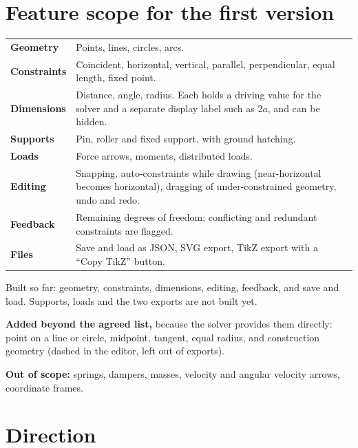 \documentclass[10pt,a4paper]{article}
\begin{document}
\section{Feature scope for the first version}

\begin{tabularx}{\textwidth}{@{}>{\bfseries}p{28mm}L@{}}
\toprule
Geometry & Points, lines, circles, arcs. \\
Constraints & Coincident, horizontal, vertical, parallel, perpendicular, equal length, fixed point. \\
Dimensions & Distance, angle, radius. Each holds a driving value for the solver and a separate display label such as $2a$, and can be hidden. \\
Supports & Pin, roller and fixed support, with ground hatching. \\
Loads & Force arrows, moments, distributed loads. \\
Editing & Snapping, auto-constraints while drawing (near-horizontal becomes horizontal), dragging of under-constrained geometry, undo and redo. \\
Feedback & Remaining degrees of freedom; conflicting and redundant constraints are flagged. \\
Files & Save and load as JSON, SVG export, TikZ export with a ``Copy TikZ'' button. \\
\bottomrule
\end{tabularx}

Built so far: geometry, constraints, dimensions, editing, feedback, and
save and load. Supports, loads and the two exports are not built yet.

\textbf{Added beyond the agreed list,} because the solver provides them
directly: point on a line or circle, midpoint, tangent, equal radius, and
construction geometry (dashed in the editor, left out of exports).

\textbf{Out of scope:} springs, dampers, masses, velocity and angular
velocity arrows, coordinate frames.

\section{Direction}
\end{document}
